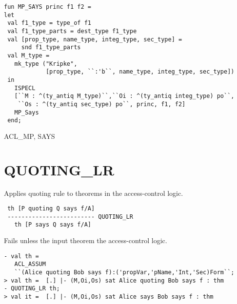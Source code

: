 \IMPLEMENTATION
\begin{holboxed}
\begin{verbatim}
fun MP_SAYS princ f1 f2 = 
let
 val f1_type = type_of f1
 val f1_type_parts = dest_type f1_type
 val [prop_type, name_type, integ_type, sec_type] = 
     snd f1_type_parts
 val M_type = 
   mk_type ("Kripke",
            [prop_type, ``:'b``, name_type, integ_type, sec_type])
 in
   ISPECL
   [``M : ^(ty_antiq M_type)``,``Oi : ^(ty_antiq integ_type) po``,
    ``Os : ^(ty_antiq sec_type) po``, princ, f1, f2]
   MP_Says
 end;
\end{verbatim}
\end{holboxed}

\SEEALSO
ACL\_MP, SAYS
\ENDDOC

\section{QUOTING\_LR}



\egroup

\SYNOPSIS
Applies quoting rule to theorems in the access-control logic.

\DESCRIBE
\begin{verbatim}
 th [P quoting Q says f/A]
 ------------------------- QUOTING_LR
   th [P says Q says f/A]
\end{verbatim}

\FAILURE
Fails unless the input theorem 
the access-control logic.

\EXAMPLE
\begin{holboxed}
\begin{verbatim}
- val th = 
   ACL_ASSUM 
   ``(Alice quoting Bob says f):('propVar,'pName,'Int,'Sec)Form``;
> val th =  [.] |- (M,Oi,Os) sat Alice quoting Bob says f : thm
- QUOTING_LR th;
> val it =  [.] |- (M,Oi,Os) sat Alice says Bob says f : thm
\end{verbatim}
\end{holboxed}

